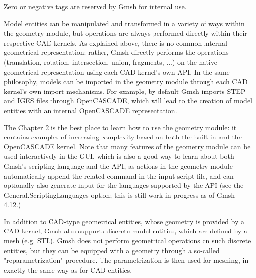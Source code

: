 \documentclass[dvipdfmx, 9pt, a4paper]{article}
\numberwithin{equation}{section}
\begin{document}
Zero or negative tags are reserved by Gmsh for internal use.\par
Model entities can be manipulated and transformed in a variety of ways within the geometry module, but operations are always performed directly within their respective CAD kernels. As explained above, there is no common internal geometrical representation: rather, Gmsh directly performs the operations (translation, rotation, intersection, union, fragments, ...) on the native geometrical representation using each CAD kernel's own API. In the same philosophy, models can be imported in the geometry module through each CAD kernel's own import mechanisms. For example, by default Gmsh imports STEP and IGES files through OpenCASCADE, which will lead to the creation of model entities with an internal OpenCASCADE representation.\par
The Chapter 2 is the best place to learn how to use the geometry module: it contains examples of increasing complexity based on both the built-in and the OpenCASCADE kernel. Note that many features of the geometry module can be used interactively in the GUI, which is also a good way to learn about both Gmsh's scripting language and the API, as actions in the geometry module automatically append the related command in the input script file, and can optionally also generate input for the languages supported by the API (see the General.ScriptingLanguages option; this is still work-in-progress as of Gmsh 4.12.)\par
In addition to CAD-type geometrical entities, whose geometry is provided by a CAD kernel, Gmsh also supports discrete model entities, which are defined by a mesh (e.g. STL). Gmsh does not perform geometrical operations on such discrete entities, but they can be equipped with a geometry through a so-called "reparametrization" procedure. The parametrization is then used for meshing, in exactly the same way as for CAD entities.
\end{document}
